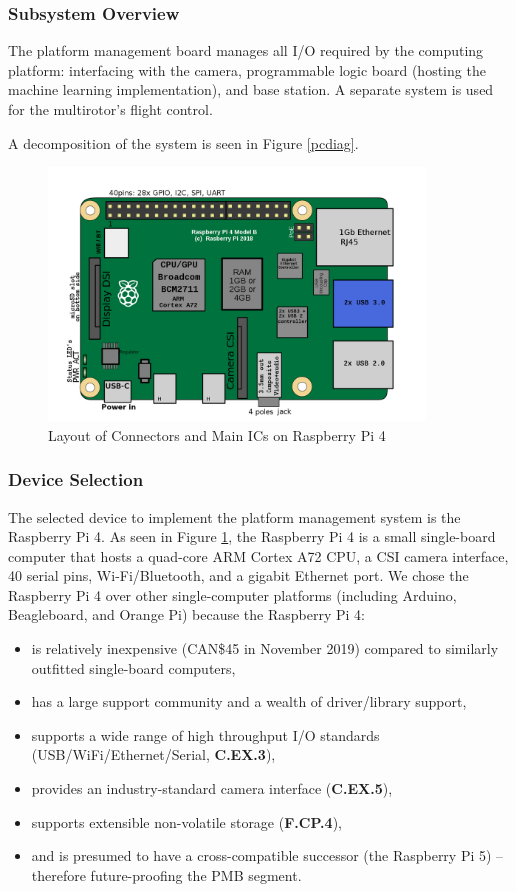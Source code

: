\subsubsection{Subsystem Overview}
The platform management board manages all I/O required by the computing platform: interfacing with the camera, programmable logic board (hosting the machine learning implementation), and base station. A separate system is used for the multirotor's flight control.

A decomposition of the system is seen in Figure \ref{pcdiag}.

\begin{figure}[H]
\centering
\includegraphics[width=10cm]{img/RaspberryPi_Model_4B.png}
\caption[Layout of Connectors and Main ICs on Raspberry Pi 4]{Layout of Connectors and Main ICs on Raspberry Pi 4\cite{rpidiag}}
\label{rpi}
\end{figure}

\subsubsection{Device Selection}

The selected device to implement the platform management system is the Raspberry Pi 4. As seen in Figure \ref{rpi}, the Raspberry Pi 4 is a small single-board computer that hosts a quad-core ARM Cortex A72 CPU, a CSI camera interface, 40 serial pins, Wi-Fi/Bluetooth, and a gigabit Ethernet port. We chose the Raspberry Pi 4 over other single-computer platforms (including Arduino, Beagleboard, and Orange Pi) because the Raspberry Pi 4:

\begin{itemize}
\item is relatively inexpensive (CAN\$45 in November 2019) compared to similarly outfitted single-board computers,
\item has a large support community and a wealth of driver/library support,
\item supports a wide range of high throughput I/O standards (USB/WiFi/Ethernet/Serial, \textbf{C.EX.3}),
\item provides an industry-standard camera interface (\textbf{C.EX.5}),
\item supports extensible non-volatile storage (\textbf{F.CP.4}),
\item and is presumed to have a cross-compatible successor (the Raspberry Pi 5) -- therefore future-proofing the PMB segment.
\end{itemize} 

